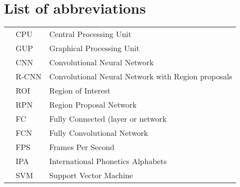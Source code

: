 \chapter*{List of abbreviations}

{\centering
\begin{longtable}{@{}p{2 cm}@{}p{2 cm}@{}p{10 cm}@{}}

&CPU&Central Processing Unit\\

&GUP&Graphical Processing Unit\\

&CNN&Convolutional Neural Network\\

&R-CNN&Convolutional Neural Network with Region proposals\\

&ROI&Region of Interest \\

&RPN& Region Proposal Network\\

&FC&Fully Connected (layer or network\\

&FCN&Fully Convolutional Network\\

&FPS&Frames Per Second \\

&IPA&International Phonetics Alphabets\\

&SVM&Support Vector Machine\\




\end{longtable}}
